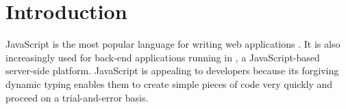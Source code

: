 \documentclass[sigconf]{acmart}
\begin{document}




\maketitle

\section{Introduction}
\label{sec:introduction}
JavaScript is the most popular language for writing web
applications \cite{github-statistics}. It is also increasingly used
for back-end applications running in \NodeJS{}, a JavaScript-based
server-side platform. JavaScript is appealing to developers because
its forgiving dynamic typing enables 
them to create simple pieces of code very quickly and proceed on a
trial-and-error basis.
\end{document}
